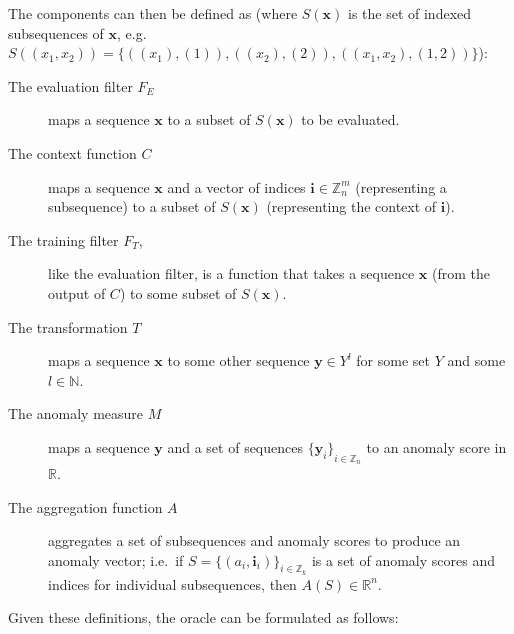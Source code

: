 The components can then be defined as (where $S(\mathbf{x})$ is the set of indexed subsequences of $\mathbf{x}$, e.g. $S((x_1, x_2)) = \{((x_1), (1)), ((x_2), (2)), ((x_1, x_2), (1, 2))\}$):
\begin{description}
    \item[The evaluation filter $F_E$]maps a sequence $\mathbf{x}$ to a subset of $S(\mathbf{x})$ to be evaluated.
    \item[The context function $C$]maps a sequence $\mathbf{x}$ and a vector of indices $\mathbf{i} \in \mathbb{Z}_n^m$ (representing a subsequence) to a subset of $S(\mathbf{x})$ (representing the context of $\mathbf{i}$).
    \item[The training filter $F_T$,]like the evaluation filter, is a function that takes a sequence $\mathbf{x}$ (from the output of $C$) to some subset of $S(\mathbf{x})$.
    \item[The transformation $T$]maps a sequence $\mathbf{x}$ to some other sequence $\mathbf{y} \in Y^l$ for some set $Y$ and some $l \in \mathbb{N}$.
    \item[The anomaly measure $M$]maps a sequence $\mathbf{y}$ and a set of sequences ${\{\mathbf{y}_i\}}_{i \in \mathbb{Z}_n}$ to an anomaly score in $\mathbb{R}$.
    \item[The aggregation function $A$]aggregates a set of subsequences and anomaly scores to produce an anomaly vector; i.e.\  if $S = {\{(a_i, \mathbf{i}_i)\}}_{i \in \mathbb{Z}_k}$ is a set of anomaly scores and indices for individual subsequences, then $A(S) \in \mathbb{R}^{n}$.
\end{description}

Given these definitions, the oracle can be formulated as follows:
\begin{algorithmic}
     
    \EndFor{}
\end{algorithmic}

